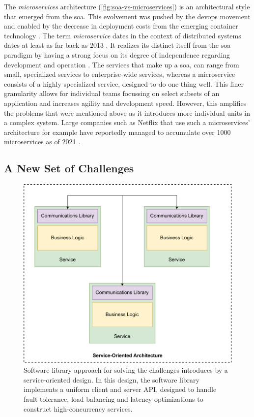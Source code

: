 The \textit{microservices} architecture (\cref{fig:soa-vs-microservices}) is an architectural style that emerged from the \gls{soa}. This evolvement was pushed by the  \gls{devops} movement and enabled by the decrease in deployment costs from the emerging \gls{container} technology \cite{amaral2015performance}.  The term \textit{microservice} dates in the context of distributed systems dates at least as far back as 2013 \cite{fowler-microservices}. It realizes its distinct itself from the \gls{soa}  paradigm by having a strong focus on its degree of independence regarding development and operation \cite{ibm-soa-vs-microservices}. The services that make up a \gls{soa}, can range from small, specialized services to enterprise-wide services, whereas a microservice consists of a highly specialized service, designed to do one thing well. This finer granularity allows for individual teams focussing on select subsets of an application and increases agility and development speed. However, this amplifies the problems that were mentioned above as it introduces more individual units in a complex system. Large companies such as Netflix that use such a microservices' architecture for example have reportedly managed to accumulate over 1000 microservices as of 2021 \cite{netflix-chaos, netflix-svc}.



\subsection{A New Set of Challenges}


\begin{figure}[!t]
    \centering
    
    \includegraphics[width=.7\linewidth]{2_background/figures/software-lib-approach.pdf}

    \caption{Software library approach for solving the challenges introduces by a service-oriented design. In this design, the software library implements a uniform client and server API, designed to  handle fault tolerance, load balancing and latency optimizations to construct high-concurrency services.}
    \label{fig:software-lib-approach}
\end{figure}

